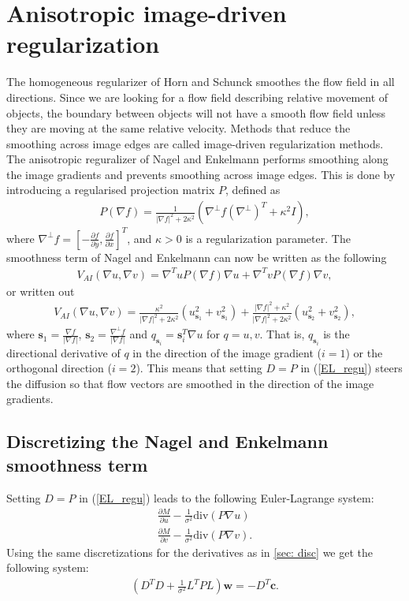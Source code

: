 \documentclass[10pt,a4paper]{article}
\begin{document}
\section{Anisotropic image-driven regularization}
The homogeneous regularizer of Horn and Schunck smoothes the flow field in all directions. Since we are looking for a flow field describing relative movement of objects, the boundary between objects will not have a smooth flow field unless they are moving at the same relative velocity. Methods that reduce the smoothing across image edges are called image-driven regularization methods. The anisotropic reguralizer of Nagel and Enkelmann \cite{NE} performs smoothing along the image gradients and prevents smoothing across image edges. This is done by introducing a regularised projection matrix $P$, defined as
\begin{align*}
P(\nabla f) = \frac{1}{|\nabla f|^2 + 2 \kappa^2} (\nabla^{\bot} f (\nabla^{\bot})^T + \kappa^2 I),
\end{align*}
where $\nabla^{\bot} f= \left[-\frac{\partial f}{\partial y}, \frac{\partial f}{\partial x}\right]^T$, and $\kappa > 0$ is a regularization parameter. The smoothness term of Nagel and Enkelmann can now be written as the following
\begin{align*}
V_{AI}(\nabla u, \nabla v) = \nabla ^T u P(\nabla f) \nabla u + \nabla ^T v P(\nabla f) \nabla v,
\end{align*}
or written out 
\begin{align*}
V_{AI}(\nabla u, \nabla v) = \frac{\kappa^2}{|\nabla f|^2 + 2 \kappa^2} \left( u_{\textbf{s}_1}^2 + v_{\textbf{s}_1}^2 \right) + \frac{|\nabla f|^2 + \kappa^2}{|\nabla f|^2 + 2 \kappa^2} \left(u_{\textbf{s}_2}^2 + v_{\textbf{s}_2}^2 \right),
\end{align*}
where $\textbf{s}_1 = \frac{\nabla f}{|\nabla f|}$, $\textbf{s}_2 = \frac{\nabla^{\bot} f}{|\nabla f|}$ and $q_{\textbf{s}_i} = \textbf{s}_i^T \nabla u$ for $q = u, v$. That is, $q_{\textbf{s}_i}$ is the directional derivative of $q$ in the direction of the image gradient ($i=1$) or the orthogonal direction ($i=2$). This means that setting $D=P$ in (\ref{EL_regu}) steers the diffusion so that flow vectors are smoothed in the direction of the image gradients.

\subsection{Discretizing the Nagel and Enkelmann smoothness term}
Setting $D=P$ in (\ref{EL_regu}) leads to the following Euler-Lagrange system:
\begin{align*}
\frac{\partial M}{\partial u} - \frac{1}{\sigma^2} \text{div}(P \nabla u) \\
\frac{\partial M}{\partial v} - \frac{1}{\sigma^2} \text{div}(P \nabla v).
\end{align*}
Using the same discretizations for the derivatives as in \ref{sec: disc} we get the following system:
\begin{align*}
(D^T D + \frac{1}{\sigma^2} L^TPL) \textbf{w} = - D^T \textbf{c}.
\end{align*}
\end{document}
